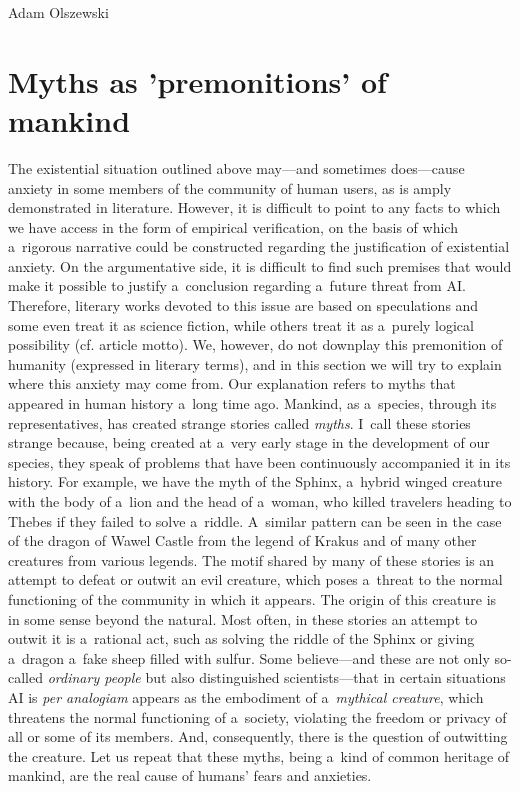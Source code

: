 \begin{artengenv}{Adam Olszewski}
\section{Myths as 'premonitions' of mankind}
The existential situation outlined above may—and sometimes does—cause anxiety in some members of the community of human users, as is amply demonstrated in literature. However, it is difficult to point to any facts to which we have access in the form of empirical verification, on the basis of which a~rigorous narrative could be constructed regarding the justification of existential anxiety. On the argumentative side, it is difficult to find such premises that would make it possible to justify a~conclusion regarding a~future threat from AI. Therefore, literary works devoted to this issue are based on speculations and some even treat it as science fiction, while others treat it as a~purely logical possibility (cf. article motto). We, however, do not downplay this premonition of humanity (expressed in literary terms), and in this section we will try to explain where this anxiety may come from. Our explanation refers to myths that appeared in human history a~long time ago. Mankind, as a~species, through its representatives, has created strange stories called \textit{myths}. I~call these stories strange because, being created at a~very early stage in the development of our species, they speak of problems that have been continuously accompanied it in its history. For example, we have the myth of the Sphinx, a~hybrid winged creature with the body of a~lion and the head of a~woman, who killed travelers heading to Thebes if they failed to solve a~riddle. A~similar pattern can be seen in the case of the dragon of Wawel Castle from the legend of Krakus and of many other creatures from various legends. The motif shared by many of these stories is an attempt to defeat or outwit an evil creature, which poses a~threat to the normal functioning of the community in which it appears. The origin of this creature is in some sense beyond the natural. Most often, in these stories an attempt to outwit it is a~rational act, such as solving the riddle of the Sphinx or giving a~dragon a~fake sheep filled with sulfur. Some believe—and these are not only so-called \textit{ordinary people} but also distinguished scientists—that in certain situations AI is \textit{per analogiam} appears as the embodiment of a~\textit{mythical creature}, which threatens the normal functioning of a~society, violating the freedom or privacy of all or some of its members. And, consequently, there is the question of outwitting the creature. Let us repeat that these myths, being a~kind of common heritage of mankind, are the real cause of humans' fears and anxieties.


\end{artengenv}
